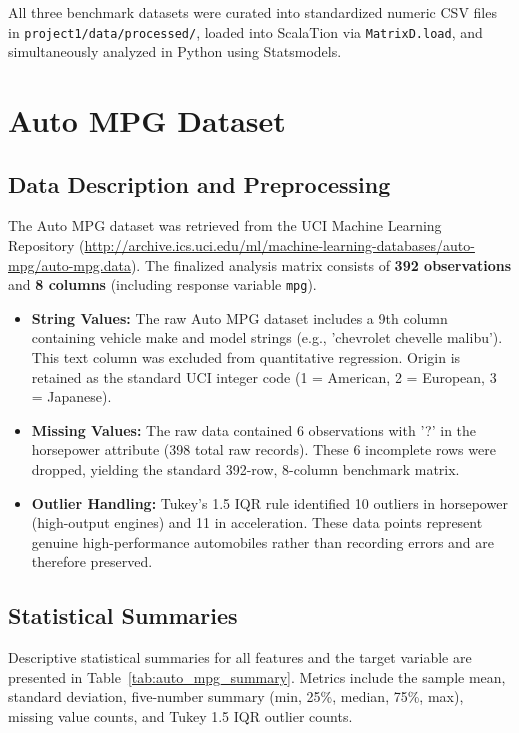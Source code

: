 \documentclass[11pt]{article}
\begin{document}
All three benchmark datasets were curated into standardized numeric CSV files in \texttt{project1/data/processed/}, loaded into ScalaTion via \texttt{MatrixD.load}, and simultaneously analyzed in Python using Statsmodels.


\section{Auto MPG Dataset}

\subsection{Data Description and Preprocessing}
The Auto MPG dataset was retrieved from the UCI Machine Learning Repository (\url{http://archive.ics.uci.edu/ml/machine-learning-databases/auto-mpg/auto-mpg.data}). The finalized analysis matrix consists of \textbf{392 observations} and \textbf{8 columns} (including response variable \texttt{mpg}).

\begin{itemize}
    \item \textbf{String Values:} The raw Auto MPG dataset includes a 9th column containing vehicle make and model strings (e.g., 'chevrolet chevelle malibu'). This text column was excluded from quantitative regression. Origin is retained as the standard UCI integer code (1 = American, 2 = European, 3 = Japanese).
    \item \textbf{Missing Values:} The raw data contained 6 observations with '?' in the horsepower attribute (398 total raw records). These 6 incomplete rows were dropped, yielding the standard 392-row, 8-column benchmark matrix.
    \item \textbf{Outlier Handling:} Tukey's 1.5 IQR rule identified 10 outliers in horsepower (high-output engines) and 11 in acceleration. These data points represent genuine high-performance automobiles rather than recording errors and are therefore preserved.
\end{itemize}

\subsection{Statistical Summaries}
Descriptive statistical summaries for all features and the target variable are presented in Table~\ref{tab:auto_mpg_summary}. Metrics include the sample mean, standard deviation, five-number summary (min, 25\%, median, 75\%, max), missing value counts, and Tukey 1.5 IQR outlier counts.
\end{document}
